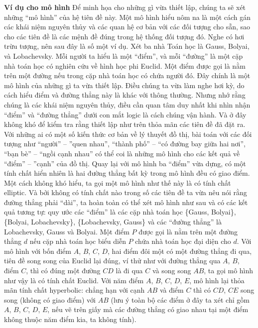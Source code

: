 \begin{multicols}{2}
	\vskip 0.1cm
	\textbf{\color{lichsutoanhoc}Ví dụ cho mô hình}
	\vskip 0.1cm
	Để minh họa cho những gì vừa thiết lập, chúng ta sẽ xét những ``mô hình'' của hệ tiên đề này. Một mô hình hiểu nôm na là một cách gán các khái niệm nguyên thủy và các quan hệ cơ bản với các đối tượng cho sẵn, sao cho các tiên đề là các mệnh đề đúng trong hệ thống đối tượng đó. Nghe có hơi trừu tượng, nên sau đây là số một ví dụ.
	\vskip 0.1cm
	Xét ba nhà Toán học là Gauss, Bolyai, và Lobachevsky. Mỗi người ta hiểu là một ``điểm'', và mỗi ``đường'' là một cặp nhà toán học có nghiên cứu về hình học phi Euclid. Một điểm được gọi là nằm trên một đường nếu trong cặp nhà toán học có chứa người đó. Đây chính là một mô hình của những gì ta vừa thiết lập.
	\vskip 0.1cm
	Điều chúng ta vừa làm nghe hơi kỳ, do cách hiểu điểm và đường thẳng này là khác với thông thường. Nhưng nhớ rằng chúng là các khái niệm nguyên thủy, điều cần quan tâm duy nhất khi nhìn nhận ``điểm'' và ``đường thẳng'' dưới con mắt logic là cách chúng vận hành. Và ở đây không khó để kiểm tra rằng thiết lập như trên thỏa mãn các tiên đề đã đặt ra. Với những ai có một số kiến thức cơ bản về lý thuyết đồ thị, bài toán với các đối tượng như ``người'' -- ''quen nhau'', ``thành phố'' -- ``có đường bay giữa hai nơi'', ``bạn bè'' -- ``ngồi cạnh nhau'' có thể coi là những mô hình cho các kết quả về ``điểm'' -- ''cạnh'' của đồ thị. 
	\vskip 0.1cm
	Quay lại với mô hình ba ``điểm'' vừa dựng, có một tính chất hiển nhiên là hai đường thẳng bất kỳ trong mô hình đều có giao điểm. Một cách không khó hiểu, ta gọi một mô hình như thế này là có tính chất elliptic.
	\vskip 0.1cm
	Và bởi không có tính chất nào trong số các tiên đề ta vừa nêu nói rằng đường thẳng phải ``dài'', ta hoàn toàn có thể xét mô hình như sau và có các kết quả tương tự: quy ước các ``điểm'' là các cặp nhà toán học \{Gauss, Bolyai\}, \{Bolyai, Lobachevsky\}, \{Lobachevsky, Gauss\} và các ``đường thẳng'' là Lobachevsky, Gauss và Bolyai. Một điểm $P$ được gọi là nằm trên một đường thẳng $d$ nếu cặp nhà toán học biểu diễn $P$ chứa nhà toán học đại diện cho $d$. 
	\vskip 0.1cm
	Với mô hình với bốn điểm $A$, $B$, $C$, $D$, hai điểm đôi một có một đường thẳng đi qua, tiên đề song song của Euclid lại đúng, ví thử như với đường thẳng qua $A$, $B$, điểm $C$, thì có đúng một đường $CD$ là đi qua $C$ và song song $AB$, ta gọi mô hình như vậy là có tính chất Euclid. Với năm điểm $A$, $B$, $C$, $D$, $E$, mô hình lại thỏa mãn tính chất hyperbolic: chẳng hạn với cạnh $AB$ và điểm $C$ thì có $CD$, $CE$ song song (không có giao điểm) với $AB$ (lưu ý toàn bộ các điểm ở đây ta xét chỉ gồm $A$, $B$, $C$, $D$, $E$, nếu vẽ trên giấy mà các đường thẳng có giao nhau tại một điểm không thuộc năm điểm kia, ta không tính).

\end{multicols}

